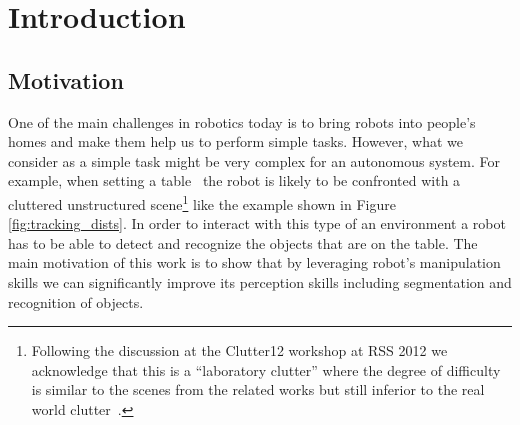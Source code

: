 \chapter{Introduction}
\label{chapter:Introduction}


 
\section{Motivation}
\label{sec:intro}
One of the main challenges in robotics today is to bring robots into people's homes and make them help us to perform simple tasks. However, what we consider as a simple task might be very complex for an autonomous system. For example, when setting a table~\cite{iros10kcopman} the robot is likely to be
confronted with a cluttered unstructured scene\footnote{Following the discussion at the Clutter12
workshop at RSS 2012 we acknowledge that this is a ``laboratory clutter'' where the degree of difficulty
is similar to the scenes from the related works but still inferior to the real world clutter~\cite{matei2010manipulation}.} like the example shown
in Figure \ref{fig:tracking_dists}. In order to interact with this type of an environment a robot has to be able to detect and recognize the objects that are on the table. The main
motivation of this work is to show that by leveraging robot's manipulation skills we can significantly improve its perception skills including segmentation and recognition of objects.
	
